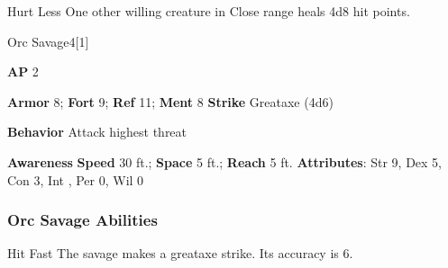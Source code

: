 \vspace{0.5em}
\begin{freeability}{Hurt Less}
One other willing creature in Close range heals 4d8 hit points.
\end{freeability}

\begin{monsection}{Orc Savage}{4}[1]
\vspace{-1em}\vspace{-1em}
\begin{spellcontent}
\begin{spelltargetinginfo}
{\textbf{AP} 2}

\pari \textbf{Armor} 8;
\textbf{Fort} 9;
\textbf{Ref} 11;
\textbf{Ment} 8
\pari \textbf{Strike} Greataxe  (4d6)



\pari \textbf{Behavior} Attack highest threat
\end{spelltargetinginfo}
\end{spellcontent}

\begin{monsterfooter}
\pari \textbf{Awareness} 
\pari \textbf{Speed} 30 ft.;
\textbf{Space} 5 ft.;
\textbf{Reach} 5 ft.
\pari \textbf{Attributes}:
Str 9,
Dex 5,
Con 3,
Int ,
Per 0,
Wil 0
\end{monsterfooter}
\end{monsection}


\subsubsection{Orc Savage Abilities}

\begin{freeability}{Hit Fast}
The savage makes a greataxe strike.
Its accuracy is 6.
\end{freeability}


